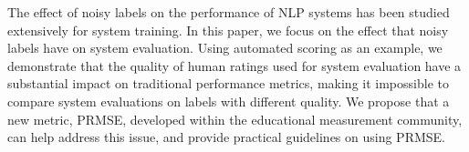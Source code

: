 The effect of noisy labels on the performance of NLP systems has been studied extensively for system training. In this paper, we focus on the effect that noisy labels have on system evaluation. Using automated scoring as an example, we demonstrate that the quality of human ratings used for system evaluation have a substantial impact on traditional performance metrics, making it impossible to compare system evaluations on labels with different quality. We propose that a new metric, PRMSE, developed within the educational measurement community, can help address this issue, and provide practical guidelines on using PRMSE.
